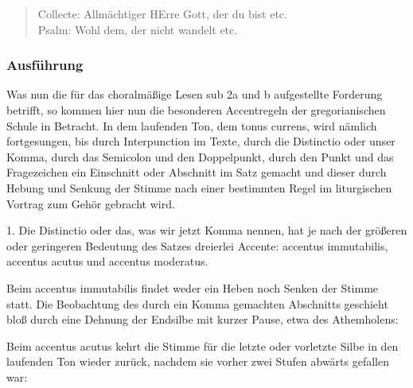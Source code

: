
\begin{verse}
Collecte: Allmächtiger HErre Gott, der du bist etc.\\
Psalm: Wohl dem, der nicht wandelt etc.
\end{verse}

\subsubsection{Ausführung}




Was nun die für das choralmäßige Lesen sub 2a und b aufgestellte Forderung betrifft, so kommen hier nun die besonderen Accentregeln der gregorianischen Schule in Betracht. In dem laufenden Ton, dem tonus currens, wird nämlich fortgesungen, bis durch Interpunction im Texte, durch die Distinctio oder unser Komma, durch das Semicolon und den Doppelpunkt, durch den Punkt und das Fragezeichen ein Einschnitt oder Abschnitt im Satz gemacht und dieser durch Hebung und Senkung der Stimme nach einer bestimmten Regel im liturgischen Vortrag zum Gehör gebracht wird.

1. Die Distinctio oder das, was wir jetzt Komma nennen, hat je nach der größeren oder geringeren Bedeutung des Satzes dreierlei Accente: accentus immutabilis, accentus acutus und accentus moderatus.

Beim accentus immutabilis findet weder ein Heben noch Senken der Stimme statt. Die Beobachtung des durch ein Komma gemachten Abschnitts geschieht bloß durch eine Dehnung der Endsilbe mit kurzer Pause, etwa des Athemholens:


Beim accentus acutus kehrt die Stimme für die letzte oder vorletzte Silbe in den laufenden Ton wieder zurück, nachdem sie vorher zwei Stufen abwärts gefallen war:



